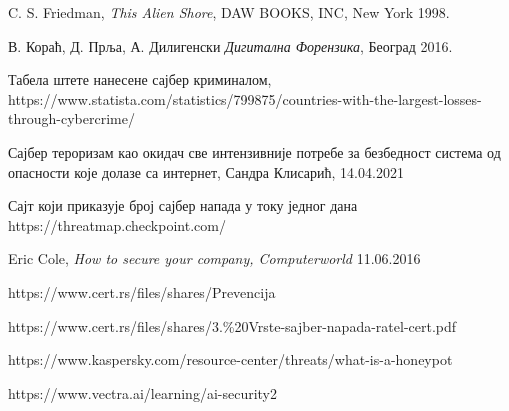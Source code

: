 \documentclass[a4paper]{article}
\begin{document}
\newpage
    \appendix

     
    

    \begin{thebibliography}{9}

    C. S. Friedman, \emph{This Alien Shore}, DAW BOOKS, INC, New York 1998.

    В. Кораћ, Д. Прља, А. Дилигенски \emph{Дигитална Форензика}, Београд 2016.

    Табела штете нанесене сајбер криминалом, https://www.statista.com/statistics/799875/countries-with-the-largest-losses-through-cybercrime/
    
    Сајбер тероризам као окидач све интензивније потребе за безбедност система од опасности које долазе са интернет, Сандра Клисарић, 14.04.2021
	  
     Сајт који приказује број сајбер напада у току једног дана https://threatmap.checkpoint.com/
	  
    Eric Cole, \emph{How to secure your company, Computerworld} 11.06.2016 
	  
    https://www.cert.rs/files/shares/Prevencija%
	  
    https://www.cert.rs/files/shares/3.\%20Vrste-sajber-napada-ratel-cert.pdf
	  
    https://www.kaspersky.com/resource-center/threats/what-is-a-honeypot
	  
     https://www.vectra.ai/learning/ai-security2
    
    \end{thebibliography}
	
    \appendix
\end{document}
